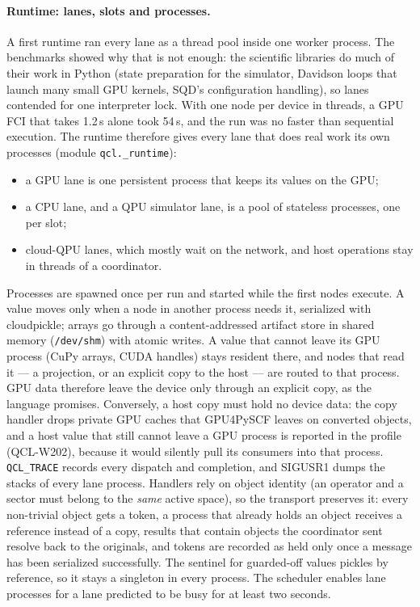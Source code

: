 \documentclass[10pt]{article}
\newcommand{\code}[1]{\texttt{#1}}
\begin{document}
\paragraph{Runtime: lanes, slots and processes.} A first runtime ran every lane as a
thread pool inside one worker process. The benchmarks showed why that is not enough:
the scientific libraries do much of their work in Python (state preparation for the
simulator, Davidson loops that launch many small GPU kernels, SQD's configuration
handling), so lanes contended for one interpreter lock. With one node per device in
threads, a GPU FCI that takes 1.2\,s alone took 54\,s, and the run was no faster than
sequential execution. The runtime therefore gives every lane that does real work its own
processes (module \code{qcl.\_runtime}):
\begin{itemize}
\item a GPU lane is one persistent process that keeps its values on the GPU;
\item a CPU lane, and a QPU simulator lane, is a pool of stateless processes, one per
slot;
\item cloud-QPU lanes, which mostly wait on the network, and host operations stay in
threads of a coordinator.
\end{itemize}
Processes are spawned once per run and started while the first nodes execute. A value
moves only when a node in another process needs it, serialized with cloudpickle; arrays
go through a content-addressed artifact store in shared memory (\code{/dev/shm}) with
atomic writes. A value that cannot leave its GPU process (CuPy arrays, CUDA handles)
stays resident there, and nodes that read it --- a projection, or an explicit copy to the
host --- are routed to that process. GPU data therefore leave the device only through an
explicit copy, as the language promises. Conversely, a host copy must hold no device
data: the copy handler drops private GPU caches that GPU4PySCF leaves on converted
objects, and a host value that still cannot leave a GPU process is reported in the
profile (QCL-W202), because it would silently pull its consumers into that process.
\code{QCL\_TRACE} records every dispatch and completion, and SIGUSR1 dumps the stacks
of every lane process. Handlers rely on object identity (an operator
and a sector must belong to the \emph{same} active space), so the transport preserves it:
every non-trivial object gets a token, a process that already holds an object receives a
reference instead of a copy, results that contain objects the coordinator sent resolve
back to the originals, and tokens are recorded as held only once a message has been
serialized successfully. The sentinel for guarded-off values pickles by reference, so it
stays a singleton in every process. The scheduler enables lane processes for a lane
predicted to be busy for at least two seconds.
\end{document}

